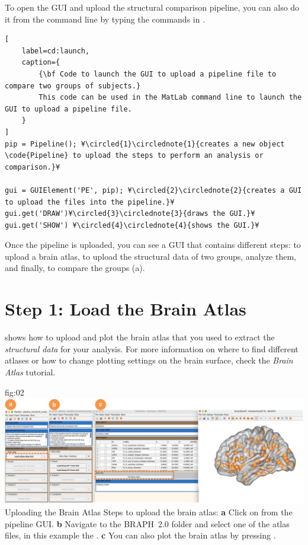 \documentclass[justified]{tufte-handout}
\begin{document}
To open the GUI and upload the structural comparison pipeline, you can also do it from the command line by typing the commands in .
%
\begin{lstlisting}[
	label=cd:launch,
	caption={
		{\bf Code to launch the GUI to upload a pipeline file to compare two groups of subjects.}
		This code can be used in the MatLab command line to launch the GUI to upload a pipeline file.
	}
]
pip = Pipeline(); ¥\circled{1}\circlednote{1}{creates a new object \code{Pipeline} to upload the steps to perform an analysis or comparison.}¥

gui = GUIElement('PE', pip); ¥\circled{2}\circlednote{2}{creates a GUI to upload the files into the pipeline.}¥
gui.get('DRAW')¥\circled{3}\circlednote{3}{draws the GUI.}¥
gui.get('SHOW') ¥\circled{4}\circlednote{4}{shows the GUI.}¥
\end{lstlisting}

Once the pipeline is uploaded, you can see a GUI that contains different steps: to upload a brain atlas, to upload the structural data of two groups, analyze them, and finally, to compare the groups (a). 

\section{Step 1: Load the Brain Atlas}
 shows how to upload and plot the brain atlas that you used to extract the \emph{structural data} for your analysis. For more information on where to find different atlases or how to change plotting settings on the brain surface, check the \emph{Brain Atlas} tutorial.

	{fig:02}
	{
	\includegraphics{fig02.jpg}
	}
	{Uploading the Brain Atlas}
	{
	Steps to upload the brain atlas:
	{\bf a} Click on  from the pipeline GUI.
	{\bf b} Navigate to the BRAPH~2.0 folder  and select one of the atlas files, in this example the . {\bf c} You can also plot the brain atlas by pressing . 
	}
 
\end{document}
